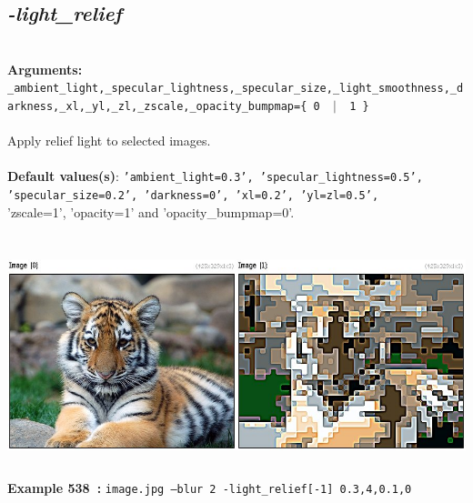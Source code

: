 \documentclass[a4paper,11pt,twoside]{book}
\begin{document}
\subsection{\emph{-light\_relief} }\vspace*{-0.5em}
~\\\textbf{Arguments: } 
{\small \texttt{\_ambient\_light,\_specular\_lightness,\_specular\_size,\_light\_smoothness,\_darkness,\_xl,\_yl,\_zl,\_zscale,\_opacity\_bumpmap=\{ 0 ~$|$~ 1 \}}}\\~\\
Apply relief light to selected images.
~\\~\\\textbf{Default values(s)}: {\small \texttt{'ambient\_light=0.3', 'specular\_lightness=0.5', 'specular\_size=0.2', 'darkness=0', 'xl=0.2', 'yl=zl=0.5',}}
~\\'zscale=1', 'opacity=1' and 'opacity\_bumpmap=0'.
\begin{center}\includegraphics[keepaspectratio=true,height=7cm,width=\textwidth]{img/gmic_def538.jpg}\\
{\footnotesize \textbf{Example 538~:} \texttt{image.jpg --blur 2 -light\_relief[-1] 0.3,4,0.1,0}}
\end{center}
\end{document}
